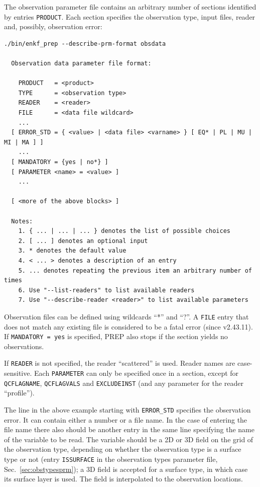 \documentclass[11pt]{report}
\begin{document}
The observation parameter file contains an arbitrary number of sections identified by entries \verb|PRODUCT|.
Each section specifies the observation type, input files, reader and, possibly, observation error:
\begin{Verbatim}[frame=single,fontsize=\footnotesize]
./bin/enkf_prep --describe-prm-format obsdata

  Observation data parameter file format:

    PRODUCT   = <product>
    TYPE      = <observation type>
    READER    = <reader>
    FILE      = <data file wildcard> 
    ...
  [ ERROR_STD = { <value> | <data file> <varname> } [ EQ* | PL | MU | MI | MA ] ]
    ...
  [ MANDATORY = {yes | no*} ]
  [ PARAMETER <name> = <value> ]
    ...

  [ <more of the above blocks> ]

  Notes:
    1. { ... | ... | ... } denotes the list of possible choices
    2. [ ... ] denotes an optional input
    3. * denotes the default value
    4. < ... > denotes a description of an entry
    5. ... denotes repeating the previous item an arbitrary number of times
    6. Use "--list-readers" to list available readers
    7. Use "--describe-reader <reader>" to list available parameters
\end{Verbatim}
Observation files can be defined using wildcards ``*'' and ``?''.
A \verb|FILE| entry that does not match any existing file is considered to be a fatal error (since v2.43.11).
If \verb|MANDATORY = yes| is specified, PREP also stops if the section yields no observations.

If \verb|READER| is not specified, the reader ``scattered'' is used.
Reader names are case-sensitive.
Each \verb|PARAMETER| can only be specified once in a section, except for \verb|QCFLAGNAME|, \verb|QCFLAGVALS| and \verb|EXCLUDEINST| (and any parameter for the reader ``profile'').

The line in the above example starting with \verb|ERROR_STD| specifies the observation error.
It can contain either a number or a file name.
In the case of entering the file name there also should be another entry in the same line specifying the name of the variable to be read.
The variable should be a 2D or 3D field on the grid of the observation type, depending on whether the observation type is a surface type or not (entry \verb|ISSURFACE| in the observation types parameter file, Sec.~\ref{sec:obstypesprm}); a 3D field is accepted for a surface type, in which case its surface layer is used.
The field is interpolated to the observation locations.
\end{document}
